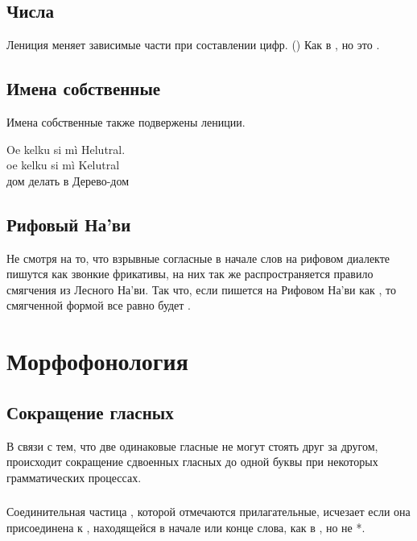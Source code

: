 \subsection{Числа}
Лениция меняет зависимые части при составлении цифр.
() Как в  ,
но  это .

\subsection{Имена собственные} Имена собственные также подвержены лениции.

\begin{interlin} \label{lenition:ex01}
\glll Oe kelku si mì Helutral. \\
      oe kelku si mì Kelutral \\
      дом делать в Дерево-дом \\
\end{interlin}


\subsection{Рифовый На'ви} 
Не смотря на то, что взрывные согласные в начале слов на рифовом диалекте пишутся как звонкие фрикативы, на них так же распространяется правило смягчения из Лесного На'ви. Так что, если   пишется на Рифовом На'ви как , то смягченной формой все равно будет .

\section{Морфофонология}

\subsection{Сокращение гласных} В связи с тем, что две одинаковые гласные не могут стоять друг за другом, происходит сокращение сдвоенных гласных до одной буквы при некоторых грамматических процессах.\label{l-and-s:contract}

\subsubsection{} Соединительная частица , которой отмечаются прилагательные, исчезает если она присоединена к , находящейся в начале или конце слова, как в
, но не *.


